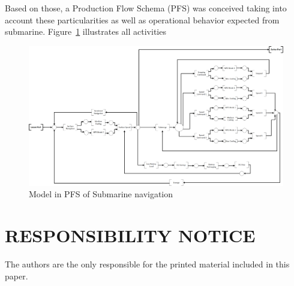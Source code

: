 \documentclass[10pt,fleqn,a4paper,twoside]{article}
\begin{document}
	Based on those, a Production Flow Schema (PFS) \citep{Miyagi1996} was conceived taking into account these particularities as well as operational behavior expected from submarine. Figure~\ref{fig:PFS} illustrates all activities

	\begin{figure}[h!]
		\centering
		\includegraphics[angle=0, scale=0.200]{PFS-navegacao.png}
		\caption{Model in PFS of Submarine navigation}
		\label{fig:PFS}
	\end{figure}



	
	\renewcommand{\refname}{}
	

	\section{RESPONSIBILITY NOTICE}
	\label{sec:legal}

	The authors are the only responsible for the printed material included in this paper.
\end{document}
